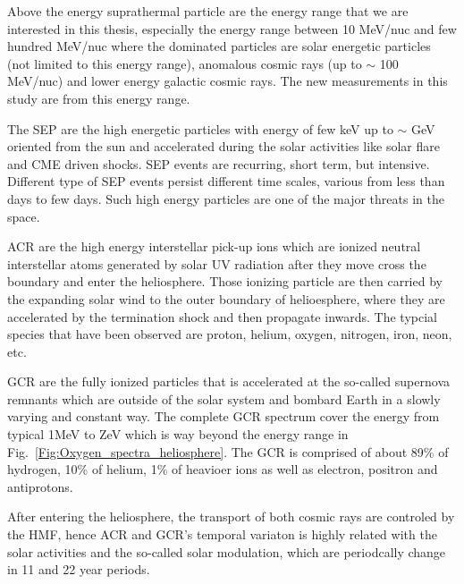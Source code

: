 Above the energy suprathermal particle are the energy range that we are interested in this thesis, especially the energy range between 10 MeV/nuc and few hundred MeV/nuc where the dominated particles are solar energetic particles (not limited to this energy range), anomalous cosmic rays (up to $\sim$ 100 MeV/nuc) and lower energy galactic cosmic rays. The new measurements in this study are from this energy range.

The \acl{SEP} are the high energetic particles with energy of few keV up to $\sim$ GeV oriented from the sun and accelerated during the solar activities like solar flare and \ac{CME} driven shocks. \acs{SEP} events are recurring, short term, but intensive. Different type of \acs{SEP} events persist different time scales, various from less than days to few days. Such high energy particles are one of the major threats in the space.

\acs{ACR} are the high energy interstellar pick-up ions \citep{Giacalone2022SSRv} which are ionized neutral interstellar atoms generated by solar UV radiation after they move cross the boundary and enter the heliosphere. Those ionizing particle are then carried by the expanding solar wind to the outer boundary of helioesphere, where they are accelerated by the termination shock and then propagate inwards. The typcial species that have been observed are proton, helium, oxygen, nitrogen, iron, neon, etc. 

\ac{GCR} are the fully ionized particles that is accelerated at the so-called supernova remnants \citep{Blasi2013AARv2013} which are outside of the solar system and bombard Earth in a slowly varying and constant way. The complete GCR spectrum cover the energy from typical 1MeV \citep{Potgieter2013LRSP} to ZeV which is way beyond the energy range in Fig.~\ref{Fig:Oxygen_spectra_heliosphere}. The \acs{GCR} is comprised of about 89\% of hydrogen, 10\% of helium, 1\% of heavioer ions as well as electron, positron and antiprotons. 

After entering the heliosphere, the transport of both cosmic rays are controled by the \ac{HMF}, hence \ac{ACR} and \ac{GCR}'s temporal variaton is highly related with the solar activities and the so-called solar modulation, which are periodcally change in 11 and 22 year periods. 


